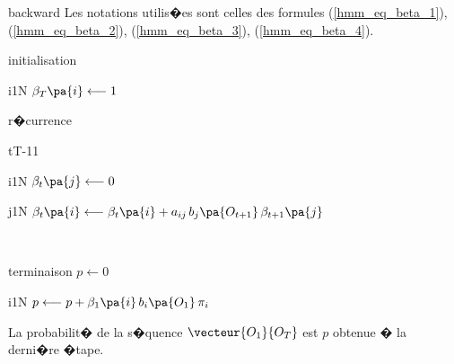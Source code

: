             \begin{xalgorithm}{backward} \label{hmm_algo_backward}
            Les notations utilis�es sont celles des formules (\ref{hmm_eq_beta_1}), (\ref{hmm_eq_beta_2}), (\ref{hmm_eq_beta_3}),
            (\ref{hmm_eq_beta_4}).
            
            \begin{xalgostep}{initialisation}
                    \begin{xfor}{i}{1}{N}
                    $\beta_T\pa{i} \longleftarrow 1$
                    \end{xfor}
            \end{xalgostep}
            
            \begin{xalgostep}{r�currence}
                    \begin{xfor}{t}{T-1}{1}
                            \begin{xfor}{i}{1}{N}
                                    $\beta_{t}\pa{j} \longleftarrow 0$ \\
                                    \begin{xfor}{j}{1}{N}
                                            $\beta_{t}\pa{i} \longleftarrow \beta_{t}\pa{i} + a_{ij}
                                             \, b_{j}\pa{O_{t+1}} \, \beta_{t+1} \pa{j}$
                                    \end{xfor} \\
                            \end{xfor}
                    \end{xfor}
            \end{xalgostep}
            
            \begin{xalgostep}{terminaison}
                    $p \longleftarrow 0$ \\
                    \begin{xfor}{i}{1}{N}
                            $p \longleftarrow p + \beta_{1}\pa{i} \, b_i\pa{O_1} \, \pi_i$
                    \end{xfor}
            \end{xalgostep}
            
            La probabilit� de la s�quence $\vecteur{O_1}{O_T}$ est $p$ obtenue � la derni�re �tape.
            
            \end{xalgorithm}
            
